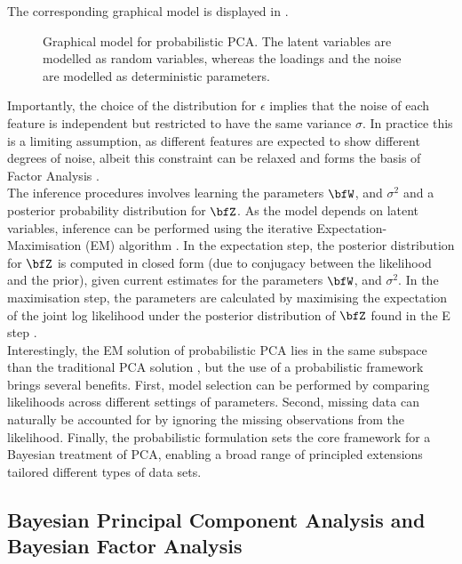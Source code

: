 The corresponding graphical model is displayed in .

\begin{figure}[H]
	\centering
	
	\caption{Graphical model for probabilistic PCA. The latent variables are modelled as random variables, whereas the loadings and the noise are modelled as deterministic parameters.}
	\label{fig:pPCA}
\end{figure}

Importantly, the choice of the distribution for $\epsilon$ implies that the noise of each feature is independent but restricted to have the same variance $\sigma$. In practice this is a limiting assumption, as different features are expected to show different degrees of noise, albeit this constraint can be relaxed and forms the basis of Factor Analysis \cite{Rubin1982,Bishop}.\\

The inference procedures involves learning the parameters $\bfW$, and $\sigma^2$ and a posterior probability distribution for $\bfZ$. As the model depends on latent variables, inference can be performed using the iterative Expectation-Maximisation (EM) algorithm \cite{Rubin1982,Bishop}. In the expectation step, the posterior distribution for $\bfZ$ is computed in closed form (due to conjugacy between the likelihood and the prior), given current estimates for the parameters $\bfW$, and $\sigma^2$. In the maximisation step, the parameters are calculated by maximising the expectation of the joint log likelihood under the posterior distribution of $\bfZ$ found in the E step \cite{Tipping1999}.\\

Interestingly, the EM solution of probabilistic PCA lies in the same subspace than the traditional PCA solution \cite{Tipping1999}, but the use of a probabilistic framework brings several benefits. First, model selection can be performed by comparing likelihoods across different settings of parameters. Second, missing data can naturally be accounted for by ignoring the missing observations from the likelihood. Finally, the probabilistic formulation sets the core framework for a Bayesian treatment of PCA, enabling a broad range of principled extensions tailored different types of data sets.


\subsection{Bayesian Principal Component Analysis and Bayesian Factor Analysis} \label{section:bayesian_pca}

